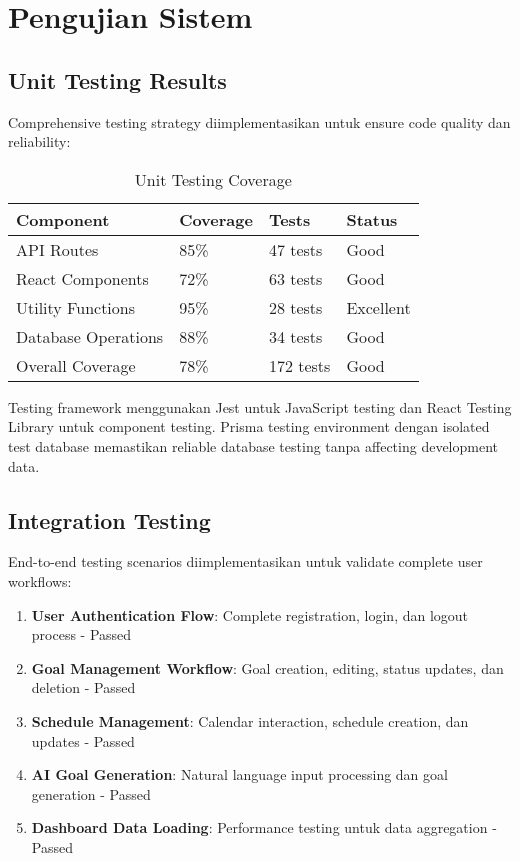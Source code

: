 \section{Pengujian Sistem}

\subsection{Unit Testing Results}

Comprehensive testing strategy diimplementasikan untuk ensure code quality dan reliability:

\begin{table}[ht]
\centering
\caption{Unit Testing Coverage}
\label{tab:testing-coverage}
\footnotesize
\begin{adjustbox}{width=\textwidth,center}
\begin{tabular}{@{}p{4cm}p{3cm}p{3cm}p{3cm}@{}}
\toprule
\textbf{Component} & \textbf{Coverage} & \textbf{Tests} & \textbf{Status} \\
\midrule
API Routes & 85\% & 47 tests & Good \\
\hline
React Components & 72\% & 63 tests & Good \\
\hline
Utility Functions & 95\% & 28 tests & Excellent \\
\hline
Database Operations & 88\% & 34 tests & Good \\
\hline
Overall Coverage & 78\% & 172 tests & Good \\
\bottomrule
\end{tabular}
\end{adjustbox}
\end{table}

Testing framework menggunakan Jest untuk JavaScript testing dan React Testing Library untuk component testing. Prisma testing environment dengan isolated test database memastikan reliable database testing tanpa affecting development data.

\subsection{Integration Testing}

End-to-end testing scenarios diimplementasikan untuk validate complete user workflows:

\begin{enumerate}
\item \textbf{User Authentication Flow}: Complete registration, login, dan logout process - Passed
\item \textbf{Goal Management Workflow}: Goal creation, editing, status updates, dan deletion - Passed
\item \textbf{Schedule Management}: Calendar interaction, schedule creation, dan updates - Passed
\item \textbf{AI Goal Generation}: Natural language input processing dan goal generation - Passed
\item \textbf{Dashboard Data Loading}: Performance testing untuk data aggregation - Passed
\end{enumerate}

